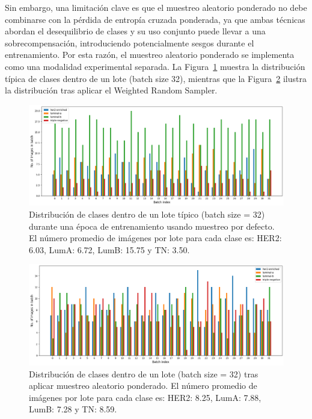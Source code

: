 \documentclass[a4paper,10pt]{book}
\begin{document}
Sin embargo, una limitación clave es que el muestreo aleatorio ponderado no debe combinarse con la pérdida de entropía cruzada ponderada, ya que ambas técnicas abordan el desequilibrio de clases y su uso conjunto puede llevar a una sobrecompensación, introduciendo potencialmente sesgos durante el entrenamiento. Por esta razón, el muestreo aleatorio ponderado se implementa como una modalidad experimental separada. La Figura~\ref{fig:batch_sampling} muestra la distribución típica de clases dentro de un lote (batch size 32), mientras que la Figura~\ref{fig:batch_sampling_weighted} ilustra la distribución tras aplicar el Weighted Random Sampler.

\begin{figure}[h!]
\centering
\includegraphics[width=.8\linewidth]{reports//assets/sampler.png}
\caption[Batch Sampling (Default)]{Distribución de clases dentro de un lote típico (batch size = 32) durante una época de entrenamiento usando muestreo por defecto. El número promedio de imágenes por lote para cada clase es: HER2: 6.03, LumA: 6.72, LumB: 15.75 y TN: 3.50.}
\label{fig:batch_sampling}
\end{figure}

\begin{figure}[ht!]
\centering
\includegraphics[width=0.8\linewidth]{reports//assets/sampler2.png}
\caption[Batch Sampling (Weighted)]{Distribución de clases dentro de un lote (batch size = 32) tras aplicar muestreo aleatorio ponderado. El número promedio de imágenes por lote para cada clase es: HER2: 8.25, LumA: 7.88, LumB: 7.28 y TN: 8.59.}
\label{fig:batch_sampling_weighted}
\end{figure}
\end{document}
